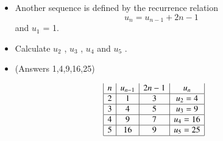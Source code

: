 \documentclass[12pt]{article}
\begin{document}
\begin{itemize}
\item Another sequence is defined by the recurrence relation 
\[ u_n = u_{n-1} + 2n-1 \] and
$u_1$ = 1.
\item Calculate $u_2$ , $u_3$ , $u_4$  and $u_5$ .
\item (Answers 1,4,9,16,25)
\end{itemize}

\[\begin{array}{|c|c|c|c|}
n    & u_{n-1} & 2n-1 & u_n \\ \hline
2      & 1         &  3   & u_2 = 4 \\ \hline
3      & 4         &  5   & u_3 = 9 \\ \hline
4      & 9         &  7   & u_4 = 16 \\ \hline
5      & 16        &  9   & u_5 = 25 \\ \hline
\end{array}\]
\end{document}
